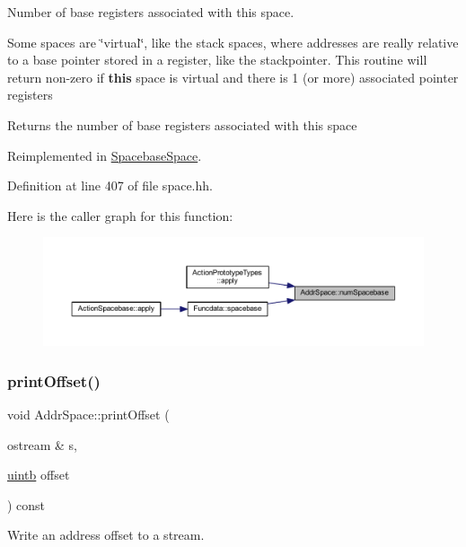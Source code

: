 Number of base registers associated with this space. 

Some spaces are \char`\"{}virtual\char`\"{}, like the stack spaces, where addresses are really relative to a base pointer stored in a register, like the stackpointer. This routine will return non-\/zero if {\bfseries{this}} space is virtual and there is 1 (or more) associated pointer registers \begin{DoxyReturn}{Returns}
the number of base registers associated with this space 
\end{DoxyReturn}


Reimplemented in \mbox{\hyperlink{class_spacebase_space_a4d1969883a570388a7e071af0b943f0e}{Spacebase\+Space}}.



Definition at line 407 of file space.\+hh.

Here is the caller graph for this function\+:
\nopagebreak
\begin{figure}[H]
\begin{center}
\leavevmode
\includegraphics[width=350pt]{class_addr_space_a1bc0bc963f33dedb721489497a92c2e3_icgraph}
\end{center}
\end{figure}
\mbox{\label{class_addr_space_aac551de6286f9260153c1d7d1bacdab8}} 
\subsubsection{\texorpdfstring{printOffset()}{printOffset()}}
{\footnotesize\ttfamily void Addr\+Space\+::print\+Offset (\begin{DoxyParamCaption}\item[{ostream \&}]{s,  }\item[{\mbox{\hyperlink{types_8h_a2db313c5d32a12b01d26ac9b3bca178f}{uintb}}}]{offset }\end{DoxyParamCaption}) const}



Write an address offset to a stream. 

